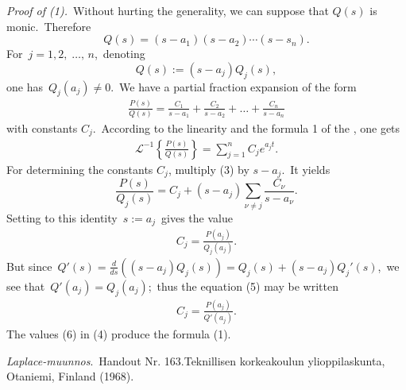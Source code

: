 \documentclass[12pt]{article}
\theoremstyle{definition}
\begin{document}
{\it Proof of (1).}\, Without hurting the generality, we can 
suppose that $Q(s)$ is monic.\, Therefore
$$Q(s) = (s\!-\!a_1)(s\!-\!a_2)\cdots(s\!-\!s_n).$$
For\, $j = 1,2,\;\ldots,\,n$,\, denoting
$$Q(s) := (s\!-\!a_j)Q_j(s),$$
one has\, $Q_j(a_j) \neq 0$.\, We have a partial fraction 
expansion of the form
\begin{align}
\frac{P(s)}{Q(s)} = \frac{C_1}{s\!-\!a_1}+\frac{C_2}{s\!-\!a_2}+\ldots+\frac{C_n}{s\!-\!a_n}
\end{align}
with constants $C_j$.\, According to the linearity and the 
formula 1 of the , 
one gets
\begin{align}
\mathcal{L}^{-1}\left\{\frac{P(s)}{Q(s)}\right\} 
= \sum_{j=1}^nC_je^{a_jt}.
\end{align}
For determining the constants $C_j$, multiply (3) by 
$s\!-\!a_j$.\, It yields
$$\frac{P(s)}{Q_j(s)} 
= C_j+(s\!-\!a_j)\sum_{\nu \neq j}\frac{C_\nu}{s\!-\!a_\nu}.$$
Setting to this identity \,$s := a_j$\, gives the value
\begin{align}
C_j = \frac{P(a_j)}{Q_j(a_j)}.
\end{align}
But since\, $Q'(s) = \frac{d}{ds}((s\!-\!a_j)Q_j(s)) 
= Q_j(s)\!+\!(s\!-\!a_j)Q_j'(s)$,\, 
we see that\, $Q'(a_j) = Q_j(a_j)$;\, thus the equation (5) may 
be written
\begin{align}
C_j = \frac{P(a_j)}{Q'(a_j)}.
\end{align}
The values (6) in (4) produce the formula (1).

\begin{thebibliography}{9}
 {\em Laplace-muunnos}.\, Handout Nr. 163.\quad Teknillisen korkeakoulun ylioppilaskunta, Otaniemi, Finland (1968).
\end{thebibliography}
\end{document}
